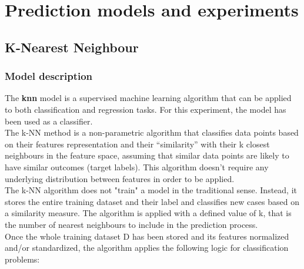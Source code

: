 \documentclass[11pt,a4paper]{article}
\begin{document}
\section{Prediction models and experiments}
\subsection{K-Nearest Neighbour}
\subsubsection{Model description}
The \textbf{\acrfull{knn}} model is a supervised machine learning algorithm that can be applied to both classification and regression tasks. For this experiment, the model has been used as a classifier.\\
The k-NN method is a non-parametric algorithm that classifies data points based on their features representation and their “similarity” with their k closest neighbours in the feature space, assuming that similar data points are likely to have similar outcomes (target labels).
This algorithm doesn’t require any underlying distribution between features in order to be applied.  \\
The k-NN algorithm does not "train" a model in the traditional sense. Instead, it stores the entire training dataset and their label and classifies new cases based on a similarity measure. The algorithm is applied with a defined value of k, that is the number of nearest neighbours to include in the prediction process.\\
Once the whole training dataset D has been stored and its features normalized and/or standardized, the algorithm applies the following logic for classification problems:
\end{document}
